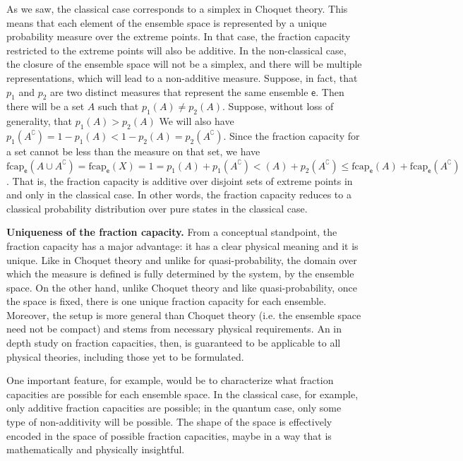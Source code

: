 \documentclass[10pt,twocolumn, nofootinbib]{revtex4-2}
\newcommand\frcap{\mathrm{fcap}}
\newcommand{\ens}[1][e] {\mathsf{#1}} %
\begin{document}
As we saw, the classical case corresponds to a simplex in Choquet theory. This means that each element of the ensemble space is represented by a unique probability measure over the extreme points. In that case, the fraction capacity restricted to the extreme points will also be additive. In the non-classical case, the closure of the ensemble space will not be a simplex, and there will be multiple representations, which will lead to a non-additive measure. Suppose, in fact, that $p_1$ and $p_2$ are two distinct measures that represent the same ensemble $\ens$. Then there will be a set $A$ such that $p_1(A) \neq p_2(A)$. Suppose, without loss of generality, that $p_1(A) > p_2(A)$ We will also have $p_1(A^{\complement}) = 1- p_1(A) < 1 - p_2(A) = p_2(A^{\complement})$. Since the fraction capacity for a set cannot be less than the measure on that set, we have $\frcap_{\ens}(A \cup A^{\complement})=\frcap_{\ens}(X) = 1 = p_1(A) + p_1(A^{\complement}) < (A) + p_2(A^{\complement}) \leq \frcap_{\ens}(A) + \frcap_{\ens}(A^{\complement})$. That is, the fraction capacity is additive over disjoint sets of extreme points in and only in the classical case. In other words, the fraction capacity reduces to a classical probability distribution over pure states in the classical case.

\textbf{Uniqueness of the fraction capacity.} From a conceptual standpoint, the fraction capacity has a major advantage: it has a clear physical meaning and it is unique. Like in Choquet theory and unlike for quasi-probability, the domain over which the measure is defined is fully determined by the system, by the ensemble space. On the other hand, unlike Choquet theory and like quasi-probability, once the space is fixed, there is one unique fraction capacity for each ensemble. Moreover, the setup is more general than Choquet theory (i.e. the ensemble space need not be compact) and stems from necessary physical requirements. An in depth study on fraction capacities, then, is guaranteed to be applicable to all physical theories, including those yet to be formulated.

One important feature, for example, would be to characterize what fraction capacities are possible for each ensemble space. In the classical case, for example, only additive fraction capacities are possible; in the quantum case, only some type of non-additivity will be possible. The shape of the space is effectively encoded in the space of possible fraction capacities, maybe in a way that is mathematically and physically insightful.
\end{document}
